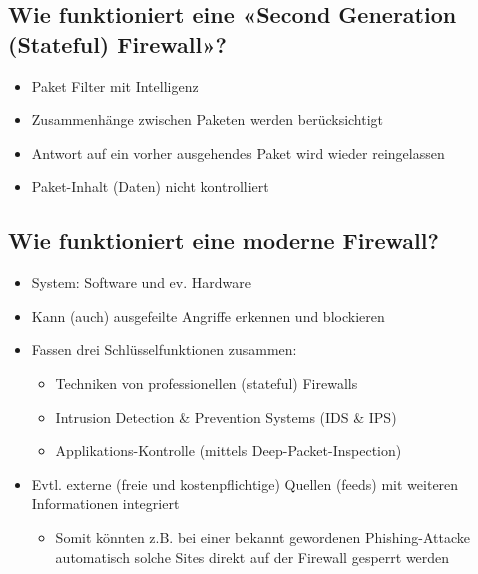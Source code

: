 \subsection*{Wie funktioniert eine «Second Generation (Stateful) Firewall»?}
\begin{itemize}
    \item Paket Filter mit Intelligenz
    \item Zusammenhänge zwischen Paketen werden berücksichtigt
    \item Antwort auf ein vorher ausgehendes Paket wird wieder reingelassen
    \item Paket-Inhalt (Daten) nicht kontrolliert
\end{itemize}

\subsection*{Wie funktioniert eine moderne Firewall?}
\begin{itemize}
    \item System: Software und ev. Hardware
    \item Kann (auch) ausgefeilte Angriffe erkennen und blockieren
    \item Fassen drei Schlüsselfunktionen zusammen:
    \begin{itemize}
        \item Techniken von professionellen (stateful) Firewalls
        \item Intrusion Detection \& Prevention Systems (IDS \& IPS)
        \item Applikations-Kontrolle (mittels Deep-Packet-Inspection)
    \end{itemize}
    \item Evtl. externe (freie und kostenpflichtige) Quellen (feeds) mit weiteren Informationen integriert
    \begin{itemize}
        \item Somit könnten z.B. bei einer bekannt gewordenen Phishing-Attacke automatisch solche Sites direkt auf der Firewall gesperrt werden
    \end{itemize}
\end{itemize}

